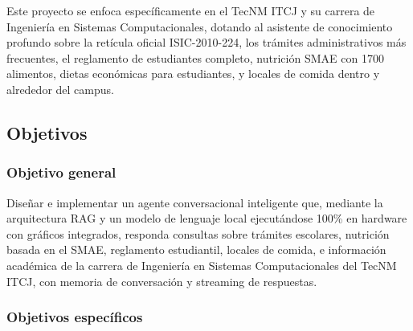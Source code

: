 Este proyecto se enfoca específicamente en el TecNM ITCJ y su carrera de Ingeniería en Sistemas Computacionales, dotando al asistente de conocimiento profundo sobre la retícula oficial ISIC-2010-224, los trámites administrativos más frecuentes, el reglamento de estudiantes completo, nutrición SMAE con 1700 alimentos, dietas económicas para estudiantes, y locales de comida dentro y alrededor del campus.

\subsection{Objetivos}

\subsubsection{Objetivo general}

Diseñar e implementar un agente conversacional inteligente que, mediante la arquitectura RAG y un modelo de lenguaje local ejecutándose 100\% en hardware con gráficos integrados, responda consultas sobre trámites escolares, nutrición basada en el SMAE, reglamento estudiantil, locales de comida, e información académica de la carrera de Ingeniería en Sistemas Computacionales del TecNM ITCJ, con memoria de conversación y streaming de respuestas.

\subsubsection{Objetivos específicos}

